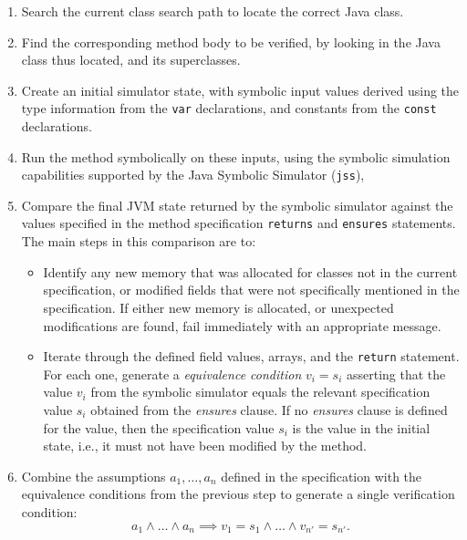 \documentclass[12pt]{galois-whitepaper}
\begin{document}
\begin{enumerate}

\item Search the current class search path to locate the correct Java class.

\item Find the corresponding method body to be verified, by looking in the
        Java class thus located, and its superclasses.

\item Create an initial simulator state, with symbolic input values derived
        using the type information from the {\tt var} declarations, and
        constants from the {\tt const} declarations.  
        \label{enum:simulator}

\item Run the method symbolically on these inputs, using the symbolic
        simulation capabilities supported by the Java Symbolic Simulator
        ({\tt{}jss}),

\item Compare the final JVM state returned by the symbolic simulator against
        the values specified in the method specification {\tt returns} and
        {\tt ensures} statements.  The main steps in this comparison are to:
        
 \begin{itemize}

   \item Identify any new memory that was allocated for classes not in the current
           specification, or modified fields that were not specifically
           mentioned in the specification.  If either new memory is allocated, or unexpected
           modifications are found, fail immediately with an appropriate message.

   \item Iterate through the defined field values, arrays, and the {\tt return} statement.
           For each one, generate a \emph{equivalence condition} $v_i = s_i$ asserting
           that the value $v_i$ from the symbolic simulator equals the relevant
           specification value $s_i$ obtained from the \emph{ensures} clause.
           If no \emph{ensures} clause is defined for the value, then
           the specification value $s_i$ is the value in the initial state, i.e., it must
           not have been modified by the method.

 \end{itemize}

 \item Combine the assumptions $a_1, \dots, a_n$ defined in the specification
         with the equivalence conditions from the previous step to generate a single
         verification condition:
       \[ a_1 \wedge \dots \wedge a_n \implies
         v_1 = s_1 \wedge \dots \wedge v_{n'} = s_{n'}.\]


\end{enumerate}
\end{document}
